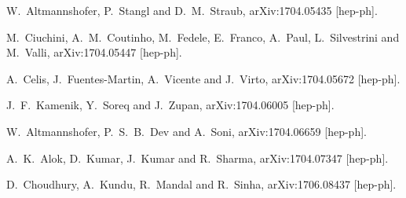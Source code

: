 \documentclass[prd,preprint,superscriptaddress,amsmath,amssymb]{revtex4}
\begin{document}
\begin{thebibliography}{100}
  
  W.~Altmannshofer, P.~Stangl and D.~M.~Straub,
  arXiv:1704.05435 [hep-ph].
  

  
  M.~Ciuchini, A.~M.~Coutinho, M.~Fedele, E.~Franco, A.~Paul, L.~Silvestrini and M.~Valli,
  arXiv:1704.05447 [hep-ph].
  
  A.~Celis, J.~Fuentes-Martin, A.~Vicente and J.~Virto,
  arXiv:1704.05672 [hep-ph].
  
  J.~F.~Kamenik, Y.~Soreq and J.~Zupan,
  arXiv:1704.06005 [hep-ph].
  
  
  W.~Altmannshofer, P.~S.~B.~Dev and A.~Soni,
  arXiv:1704.06659 [hep-ph].
  
  
  
  
  A.~K.~Alok, D.~Kumar, J.~Kumar and R.~Sharma,
  arXiv:1704.07347 [hep-ph].
    
      
  D.~Choudhury, A.~Kundu, R.~Mandal and R.~Sinha,
  arXiv:1706.08437 [hep-ph].
 

\end{thebibliography}
\end{document}
